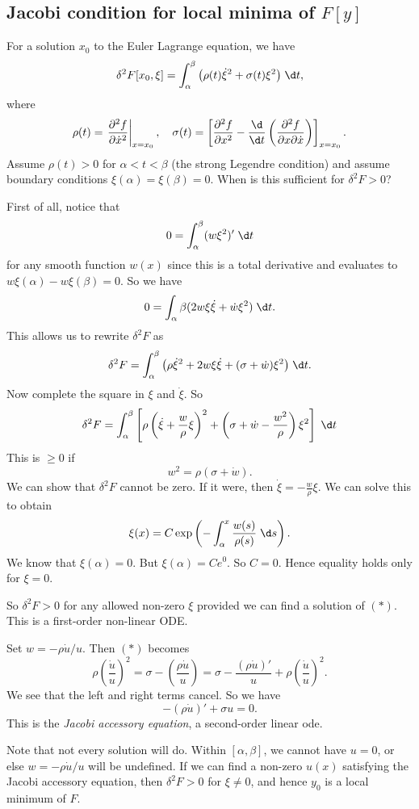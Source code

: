 \documentclass[a4paper]{article}
\begin{document}
\subsection{Jacobi condition for local minima of \texorpdfstring{$F[y]$}{F[y]}}
For a solution $x_0$ to the Euler Lagrange equation, we have
\[
  \delta^2 F[x_0, \xi] = \int_\alpha^\beta \big(\rho(t) \dot{\xi}^2 + \sigma(t) \xi^2\big)\;\d t,
\]
where
\[
  \rho(t) = \left.\frac{\partial^2 f}{\partial \dot{x}^2}\right|_{x = x_0},\quad
  \sigma(t) = \left[\frac{\partial^2 f}{\partial x^2} - \frac{\d}{\d t}\left(\frac{\partial^2 f}{\partial x \partial \dot{x}}\right)\right]_{x = x_0}.
\]
Assume $\rho(t) > 0$ for $\alpha < t < \beta$ (the strong Legendre condition) and assume boundary conditions $\xi(\alpha) = \xi(\beta) = 0$. When is this sufficient for $\delta^2 F > 0$?

First of all, notice that
\[
  0 = \int_\alpha^\beta (w\xi^2)' \;\d t
\]
for any smooth function $w(x)$ since this is a total derivative and evaluates to $w\xi(\alpha) - w\xi(\beta) = 0$. So we have
\[
  0 = \int_\alpha\beta (2w\xi \dot{\xi} + \dot{w}\xi^2)\;\d t.
\]
This allows us to rewrite $\delta^2 F$ as
\[
  \delta^2 F = \int_\alpha^\beta \big(\rho \dot{\xi}^2 + 2w\xi \dot{\xi} + (\sigma + \dot{w})\xi^2\big)\;\d t.
\]
Now complete the square in $\xi$ and $\dot{\xi}$. So
\[
  \delta^2 F = \int_\alpha^\beta \left[\rho\left(\dot{\xi} + \frac{w}{\rho} \xi\right)^2 +\left(\sigma + \dot{w} - \frac{w^2}{\rho}\right)\xi^2 \right]\;\d t
\]
This is $\geq 0$ if
\[
  w^2 = \rho(\sigma + \dot{w}).\tag{$*$}
\]
We can show that $\delta^2 F$ cannot be zero. If it were, then $\dot{\xi} = -\frac{w}{\rho}\xi$. We can solve this to obtain
\[
  \xi(x) = C\exp\left(-\int_\alpha^x \frac{w(s)}{\rho(s)}\;\d s\right).
\]
We know that $\xi(\alpha) = 0$. But $\xi(\alpha) = C e^0$. So $C = 0$. Hence equality holds only for $\xi = 0$.

So $\delta^2 F > 0$ for any allowed non-zero $\xi$ provided we can find a solution of $(*)$. This is a first-order non-linear ODE.

Set $w = -\rho \dot{u}/u$. Then $(*)$ becomes
\[
  \rho\left(\frac{\dot{u}}{u}\right)^2 = \sigma - \left(\frac{\rho \dot{u}}{u}\right) = \sigma - \frac{(\rho \dot{u})'}{u} + \rho \left(\frac{\dot{u}}{u}\right)^2.
\]
We see that the left and right terms cancel. So we have
\[
  -(\rho \dot{u})' + \sigma u = 0.
\]
This is the \emph{Jacobi accessory equation}, a second-order linear ode.

Note that not every solution will do. Within $[\alpha, \beta]$, we cannot have $u = 0$, or else $w = -\rho \dot{u}/u$ will be undefined. If we can find a non-zero $u(x)$ satisfying the Jacobi accessory equation, then $\delta^2 F > 0$ for $\xi \not= 0$, and hence $y_0$ is a local minimum of $F$.
\end{document}

